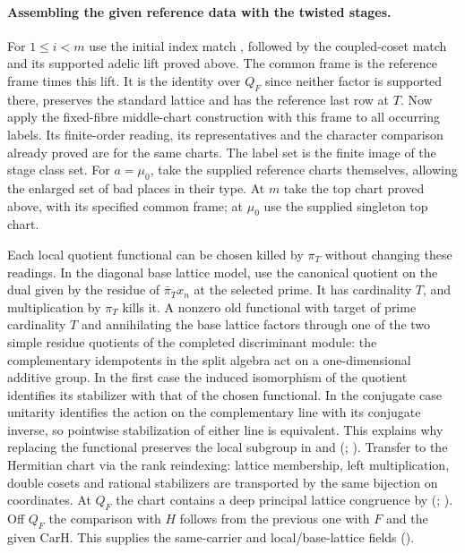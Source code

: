 \paragraph{Assembling the given reference data with the twisted stages.}\label{r13:stage-pack}
For $1\le i<m$ use the initial index match
, followed by the coupled-coset
match and its supported adelic lift proved above. The common frame
is the reference frame times this lift. It is the identity over $Q_F$
since neither factor is supported there, preserves the standard
lattice and has the reference last row at $T$. Now apply the fixed-fibre
middle-chart construction  with this frame to all
occurring labels. Its finite-order reading, its representatives and the
character comparison already proved are for the same charts. The label
set is the finite image of the stage class set. For $a=\mu_0$, take the
supplied reference charts themselves, allowing the enlarged set of bad
places in their type. At $m$ take the top chart proved above, with its
specified common frame; at $\mu_0$ use the supplied singleton top chart.

Each local quotient functional can be chosen killed by $\pi_T$
without changing these readings. In the diagonal base lattice model,
use the canonical quotient on the dual given by the residue of
$\bar\pi_T x_n$ at the selected prime. It has cardinality $T$, and
multiplication by $\pi_T$ kills it. A nonzero old functional with
target of prime cardinality $T$ and annihilating the base lattice
factors through one of the two simple residue quotients of the
completed discriminant module: the complementary idempotents in the
split algebra act on a one-dimensional additive group. In the first
case the induced isomorphism of the quotient identifies its stabilizer
with that of the chosen functional. In the conjugate case unitarity
identifies the action on the complementary line with its conjugate
inverse, so pointwise stabilization of either line is equivalent.
This explains why replacing the functional preserves the local
subgroup in  and 
(;
).
Transfer to the Hermitian chart via the rank reindexing: lattice
membership, left multiplication, double cosets and rational stabilizers
are transported by the same bijection on coordinates. At $Q_F$ the
chart contains a deep principal lattice congruence by
(;
). Off
$Q_F$ the comparison with $H$ follows from the previous one with $F$
and the given $\mathrm{CarH}$. This supplies the same-carrier and
local/base-lattice fields ().

